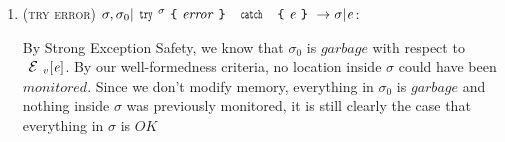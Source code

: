 \begin{enumerate}
\begin{itemize}
\end{itemize}

\item (\textsc{try error}) $\sigma,\sigma_0|\Kw{try}^\sigma\oC \mathit{error}\cC\ \Kw{catch}\ \oC\e\cC\rightarrow \sigma|\e$:

	By Strong Exception Safety, we know that $\sigma_0$ is $\mathit{garbage}$ with respect to $\ctx_v[\e]$. By our well-formedness criteria, no location inside $\sigma$ could have been $monitored$.
	Since we don’t modify memory, everything in $\sigma_0$ is $\mathit{garbage}$ and nothing inside $\sigma$ was previously monitored, it is still clearly the case that everything in $\sigma$ is $\mathit{OK}$ 
\end{enumerate}